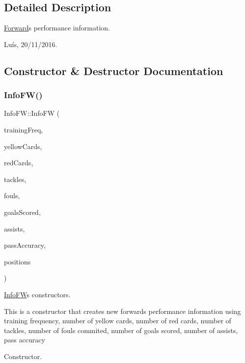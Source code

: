 \subsection{Detailed Description}
\hyperlink{class_forward}{Forward}\textquotesingle{}s performance information. 

Luís, 20/11/2016. 

\subsection{Constructor \& Destructor Documentation}
\hypertarget{class_info_f_w_a03c85ce3609ac34d37f0afee1e4a67c6}{}\label{class_info_f_w_a03c85ce3609ac34d37f0afee1e4a67c6} 
\subsubsection{\texorpdfstring{Info\+F\+W()}{InfoFW()}\hspace{0.1cm}{\footnotesize\ttfamily [1/4]}}
{\footnotesize\ttfamily Info\+F\+W\+::\+Info\+FW (\begin{DoxyParamCaption}\item[{\hyperlink{class_fraction}{Fraction}}]{training\+Freq,  }\item[{unsigned int}]{yellow\+Cards,  }\item[{unsigned int}]{red\+Cards,  }\item[{unsigned int}]{tackles,  }\item[{unsigned int}]{fouls,  }\item[{unsigned int}]{goals\+Scored,  }\item[{unsigned int}]{assists,  }\item[{\hyperlink{class_fraction}{Fraction}}]{pass\+Accuracy,  }\item[{vector$<$ \hyperlink{_utils_8hpp_ae6ffae6f01bd3312aac4a44642f14620}{Forward\+Position} $>$}]{positions }\end{DoxyParamCaption})}



\hyperlink{class_info_f_w}{Info\+FW}\textquotesingle{}s constructors. 

This is a constructor that creates new forward\textquotesingle{}s performance information using training frequency, number of yellow cards, number of red cards, number of tackles, number of fouls commited, number of goals scored, number of assists, pass accuracy 

Constructor. 


